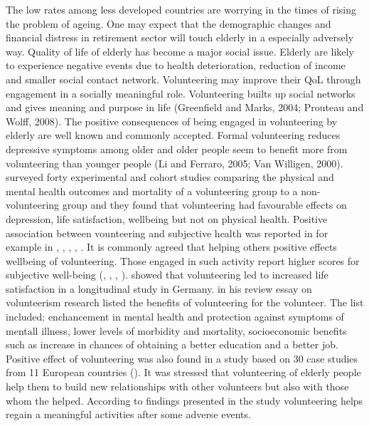 \documentclass[10pt, letterpaper]{article}
\begin{document}
\begin{spacing}{1.4}
The low rates among less developed countries are worrying in the times of rising the problem of ageing. One may expect that the demographic changes and financial distress in retirement sector  will touch elderly in a especially adversely way.  Quality of life of elderly has become a major social issue. Elderly are likely to experience negative events due to health deterioration, reduction of income and smaller social contact network. Volunteering may improve their QoL through engagement in a socially meaningful role. Volunteering builts up social networks and gives meaning and purpose in life (Greenfield and Marks, 2004; Prouteau and Wolff, 2008). The positive consequences of being engaged in volunteering by elderly are well known and commonly accepted. Formal volunteering reduces depressive symptoms among older and older people seem to benefit more from volunteering than younger people (Li and Ferraro, 2005; Van Willigen, 2000). \citet{jenkinson2013volunteering} surveyed forty experimental and cohort studies comparing the physical and mental health outcomes and mortality of a volunteering group to a non-volunteering group and they found that volunteering had favourable effects on depression, life satisfaction, wellbeing but not on physical health. Positive association between vounteering and subjective health was reported in for example in  \citet{borgonovi08}, \cite{anderson14}, \cite{li06}, \cite{VanWilligen00}, \citet{detollenaere17}. It is commonly agreed that helping others positive effects wellbeing of volunteering. Those engaged in such activity report higher scores for subjective well-being (\citet{haski09}, \citet{morrow2003}, \citep{thoits03}, \citep{whillans2016}). \citep{meier08} showed that volunteering led to increased life satisfaction in a longitudinal study in Germany. \citet{wilson12} in his review essay on volunteerism research  listed the benefits of volunteering for the volunteer. The list included: enchancement in mental health and protection against symptoms of mentall illness, lower levels of morbidity and mortality, socioeconomic benefits such as increase in chances of obtaining a better education and a better job. Positive effect of volunteering was also found in a study based on 30 case studies from 11 European countries (\citet{ehlers11}). It was stressed that volunteering of elderly people help them to build new relationships with other volunteers but also with those whom the helped. According to findings presented in the study volunteering helps regain a meaningful activities after some adverse events.   \\


\end{spacing}
\end{document}
